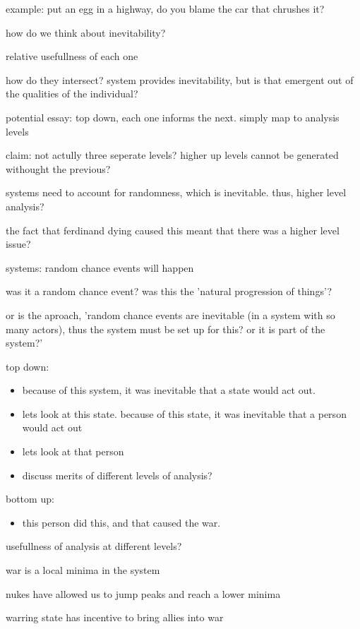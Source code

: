 \documentclass[letterpaper]{article}
\begin{document}
example: put an egg in a highway, do you blame the car that chrushes it?

how do we think about inevitability?

relative usefullness of each one

how do they intersect? system provides inevitability, but is that
emergent out of the qualities of the individual?

potential essay: top down, each one informs the next. simply map to
analysis levels

claim: not actully three seperate levels? higher up levels cannot be
generated withought the previous?

systems need to account for randomness, which is inevitable. thus,
higher level analysis?

the fact that ferdinand dying caused this meant that there was a higher
level issue?

systems: random chance events will happen

was it a random chance event? was this the 'natural progression of
things'?

or is the aproach, 'random chance events are inevitable (in a system
with so many actors), thus the system must be set up for this? or it is
part of the system?'

top down:

\begin{itemize}
\item because of this system, it was inevitable that a state would act out.
\item lets look at this state. because of this state, it was inevitable that
a person would act out
\item lets look at that person
\item discuss merits of different levels of analysis?
\end{itemize}

bottom up:

\begin{itemize}
\item this person did this, and that caused the war.
\end{itemize}

usefullness of analysis at different levels?

war is a local minima in the system

nukes have allowed us to jump peaks and reach a lower minima

warring state has incentive to bring allies into war
\end{document}
